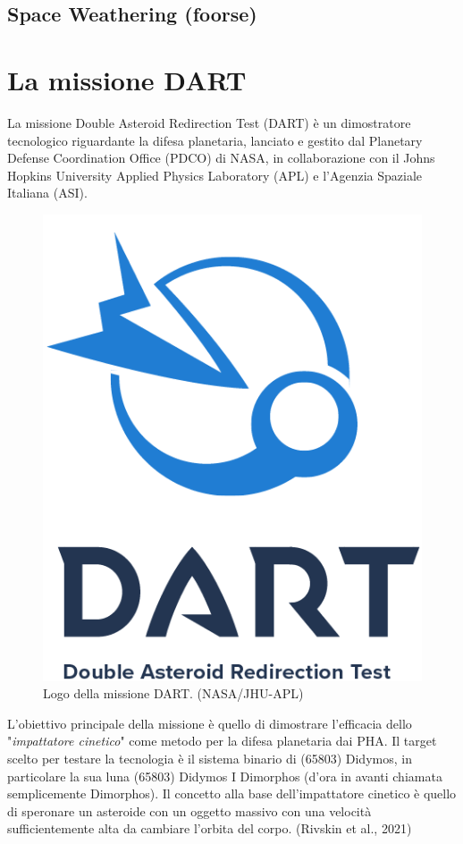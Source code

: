\documentclass[a4paper,11pt,openright]{book}
\begin{document}
\section{Space Weathering (foorse)}

\chapter{La missione DART}

La missione Double Asteroid Redirection Test (DART) è un dimostratore tecnologico riguardante la difesa planetaria, lanciato e gestito dal Planetary Defense Coordination Office (PDCO) di NASA, in collaborazione con il Johns Hopkins University Applied Physics Laboratory (APL) e l'Agenzia Spaziale Italiana (ASI).

\begin{figure}[!h]
    \centering
    \includegraphics[scale=0.5]{figure/DART_mission_patch.png}
    \caption[Logo della missione DART]{Logo della missione DART. (NASA/JHU-APL)}
    \label{fig:logo_DART}
\end{figure}

L'obiettivo principale della missione è quello di dimostrare l'efficacia dello "\textit{impattatore cinetico}" come metodo per la difesa planetaria dai PHA. Il target scelto per testare la tecnologia è il sistema binario di (65803) Didymos, in particolare la sua luna (65803) Didymos I Dimorphos (d'ora in avanti chiamata semplicemente Dimorphos). Il concetto alla base dell'impattatore cinetico è quello di speronare un asteroide con un oggetto massivo con una velocità sufficientemente alta da cambiare l'orbita del corpo. (Rivskin et al., 2021)
\end{document}
